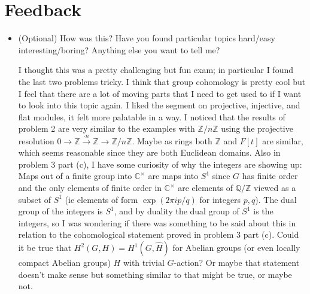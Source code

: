 \documentclass[11pt]{article}
\begin{document}
\section{Feedback}
\begin{itemize}
    \item (Optional) How was this? Have you found particular topics hard/easy interesting/boring?
    Anything else you want to tell me? 

    I thought this was a pretty challenging but fun exam; in particular I found the last two problems tricky. I think that group cohomology is pretty cool but I feel that there are a lot of moving parts that I need to get used to if I want to look into this topic again. I liked the segment on projective, injective, and flat modules, it felt more palatable in a way. I noticed that the results of problem 2 are very similar to the examples with $\mathbb{Z}/n\mathbb{Z}$ using the projective resolution $0\to \mathbb{Z}\xrightarrow{\cdot n}\mathbb{Z}\to \mathbb{Z}/n\mathbb{Z}$. Maybe as rings both $\mathbb{Z}$ and $F[t]$ are similar, which seems reasonable since they are both Euclidean domains. Also in problem 3 part (c), I have some curiosity of why the integers are showing up: Maps out of a finite group into $\mathbb{C}^\times$ are maps into $S^1$ since $G$ has finite order and the only elements of finite order in $\mathbb{C}^\times$ are elements of $\mathbb{Q}/\mathbb{Z}$ viewed as a subset of $S^1$ (ie elements of form $\exp(2\pi i p/q)$ for integers $p,q$). The dual group of the integers is $S^1$, and by duality the dual group of $S^1$ is the integers, so I was wondering if there was something to be said about this in relation to the cohomological statement proved in problem 3 part (c). Could it be true that $H^2(G,H) = H^1(G,\hat H)$ for Abelian groups (or even locally compact Abelian groups) $H$ with trivial $G$-action? Or maybe that statement doesn't make sense but something similar to that might be true, or maybe not.
\end{itemize}
\end{document}
